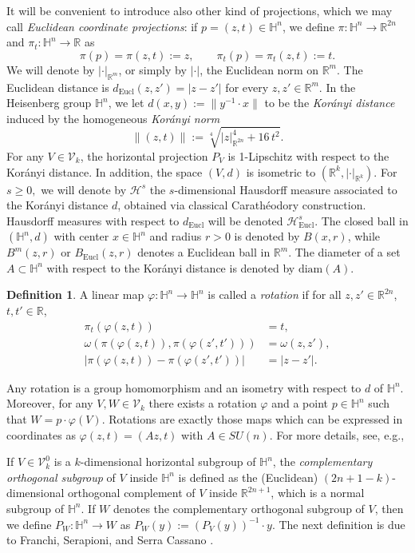 \documentclass[12pt]{amsart}
\newcommand{\R}{\mathbb R}
\renewcommand{\H}{\mathbb H}
\numberwithin{equation}{section}
\theoremstyle{plain}
\theoremstyle{definition}
\newtheorem{definition}[theorem]{Definition}
\theoremstyle{remark}
\begin{document}
It will be convenient to introduce also other kind of projections, which we may call \textit{Euclidean coordinate projections}: if $p=(z,t)\in\H^n$, we define $\pi:\H^{n}\to\R^{2n}$ and $\pi_t:\H^n\to\R$ as
\[\pi(p)=\pi(z,t):=z,\qquad \pi_t(p)=\pi_t(z,t):=t.\]
We will denote by $|\cdot|_{\mathbb{R}^m}$, or simply by $|\cdot|$, the Euclidean norm on $\mathbb{R}^m$. The Euclidean distance is $d_{\mathrm{Eucl}}(z,z')=|z-z'|$ for every $z,z'\in\R^m$.
In the Heisenberg group $\mathbb{H}^n$, we let $d(x,y):=\|y^{-1}\cdot x\|$ to be the \emph{Korányi distance}  induced by the homogeneous \emph{Korányi norm}
\begin{equation}\label{eq:KoranyiNorm}
\|(z,t)\|:=\sqrt[4]{|z|_{\R^{2n}}^4+16\,t^2}.
\end{equation}
For any $V\in \mathcal V_k$, the horizontal projection $P_V$ is 1-Lipschitz with respect to the Korányi
distance. In addition, the space $(V,d)$ is isometric to $(\R^k, |\cdot|_{\R^k})$. For $s\geq 0,$ we will  denote by $\mathcal H^s$ the $s$-dimensional Hausdorff measure associated to the Korányi distance $d$, obtained via classical Carathéodory construction. Hausdorff measures with respect to $d_{\mathrm{Eucl}}$ will be denoted $\mathcal{H}^s_{\mathrm{Eucl}}$.
The closed ball in $(\mathbb{H}^n,d)$ with center $x\in \mathbb{H}^n$ and radius $r>0$ is denoted by $B(x,r)$, while $B^m(z,r)$ or $B_{\mathrm{Eucl}}(z,r)$ denotes a Euclidean ball in $\mathbb{R}^m$. The diameter of a set $A\subset \mathbb{H}^n$ with respect to the Korányi distance is denoted by $\mathrm{diam}(A)$.
\begin{definition}\label{d:rot}
    A linear map $\varphi:\H^n\to\H^n$ is called a \textit{rotation} if for all $z,z'\in\R^{2n}$, $t,t'\in\R$, 
    \begin{align*}\pi_t(\varphi(z,t))&=t,\\ \omega\left(\pi(\varphi(z,t)),\pi(\varphi(z',t'))\right)&=\omega(z,z'),\\ |\pi(\varphi(z,t))-\pi(\varphi(z',t'))|&=|z-z'|.\end{align*} 
\end{definition}
Any rotation is a group homomorphism and an isometry with respect to $d$ of $\H^n$. Moreover, for any $V,W\in\mathcal V_k$ there exists a rotation $\varphi$ and a point $p\in\H^n$ such that $W=p\cdot\varphi(V)$. Rotations are exactly those maps which can be expressed in coordinates as $\varphi(z,t)=(Az,t)$ with $A\in SU(n)$. For more details, see, e.g.,  \cite[Section 2]{MR2955184}\vspace{0.25 cm}\par
If $V\in \mathcal{V}_k^0$ is a $k$-dimensional horizontal subgroup of $\H^n$, the \textit{complementary orthogonal subgroup} of $V$ inside $\H^n$ is defined as the (Euclidean)  $(2n+1-k)$-dimensional orthogonal complement of  $V$ inside $\R^{2n+1}$, which is a normal subgroup of $\H^n$. If $W$ denotes the complementary orthogonal subgroup of $V$, then we define $P_W:\H^n\to W$ as $P_W(y):=(P_V(y))^{-1}\cdot y$.
The next definition is due to Franchi, Serapioni, and Serra Cassano \cite{MR2313532,MR3587666}.
\end{document}

